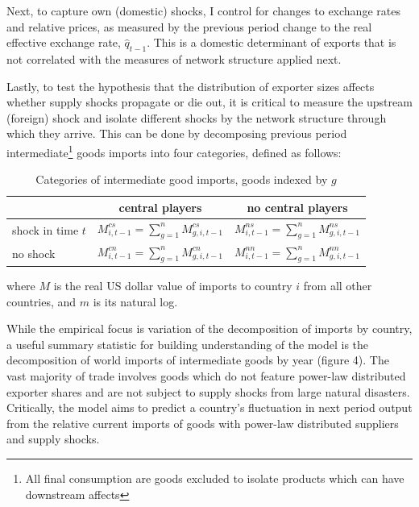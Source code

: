 \documentclass[10pt,letterpaper,pdftex]{article}
\begin{document}
Next, to capture own (domestic) shocks, I control for changes to exchange rates and relative prices, as measured by the previous period change to the real effective exchange rate, $\hat{q}_{t-1}$. This is a domestic determinant of exports that is not correlated with the measures of network structure applied next.

Lastly, to test the hypothesis that the distribution of exporter sizes affects whether supply shocks propagate or die out, it is critical to measure the upstream (foreign) shock and isolate different shocks by the network structure through which they arrive. This can be done by decomposing previous period intermediate\footnote{All final consumption are goods excluded to isolate products which can have downstream affects} goods imports into four categories, defined as follows:

\begin{table}[ht]\centering \caption{Categories of intermediate good imports, goods indexed by $g$ \label{mtab}}
	\begin{tabular}{l | c | c}
	\toprule
	 & central players & no central players \\
	 \midrule
	 shock in time $t$ & $M^{cs}_{i,t-1} = \sum_{g=1}^{n} M^{cs}_{g,i,t-1}$ & $M^{ns}_{i,t-1} = \sum_{g=1}^{n}M^{ns}_{g,i,t-1}$ \\
	 \midrule
	 no shock & $M^{cn}_{i,t-1} = \sum_{g=1}^{n} M^{cn}_{g,i,t-1}$ & $M^{nn}_{i,t-1} = \sum_{g=1}^{n}M^{nn}_{g,i,t-1}$ \\
	 \bottomrule
	\end{tabular}
	\end{table}
	
where $M$ is the real US dollar value of imports to country $i$ from all other countries, and $m$ is its natural log.

While the empirical focus is variation of the decomposition of imports by country, a useful summary statistic for building understanding of the model is the decomposition of world imports of intermediate goods by year (figure 4). The vast majority of trade involves goods which do not feature power-law distributed exporter shares and are not subject to supply shocks from large natural disasters. Critically, the model aims to predict a country's fluctuation in next period output from the relative current imports of goods with power-law distributed suppliers and supply shocks.
\end{document}
